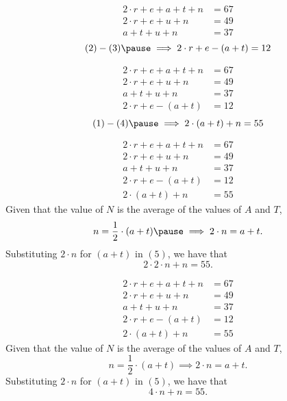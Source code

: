 \documentclass{beamer} %
\begin{document}
\begin{frame}
  \begin{align}
    2\cdot r+e+a+t+n &= 67 \\
    2\cdot r+e+u+n &= 49   \\
    a+t+u+n &= 37
  \end{align}\pause
  \[
    (2) - (3) \pause \implies 2\cdot r+e-(a+t)=12
  \]
\end{frame}

\setcounter{equation}{0} %

\begin{frame}
  \begin{align}
    2\cdot r+e+a+t+n &= 67 \\
    2\cdot r+e+u+n &= 49   \\
    a+t+u+n &= 37          \\
    2\cdot r+e-(a+t) &= 12
  \end{align}\pause
  \[
    (1) - (4) \pause \implies 2\cdot(a+t)+n=55
  \]
\end{frame}

\setcounter{equation}{0}

\begin{frame}
  \begin{align}
    2\cdot r+e+a+t+n &= 67 \\
    2\cdot r+e+u+n &= 49   \\
    a+t+u+n &= 37          \\
    2\cdot r+e-(a+t) &= 12 \\
    2\cdot(a+t)+n &= 55
  \end{align}\pause
  Given that the value of $N$ is the average of the values of $A$ and $T$,\pause
  \[
    n=\frac{1}{2}\cdot(a+t) \pause \implies 2 \cdot n = a + t.
  \]\pause
  Substituting $2\cdot n$ for $(a+t)$ in $(5)$, we have that\pause
  \[
    2\cdot 2\cdot n+n=55.
  \]
\end{frame}

\setcounter{equation}{0}

\begin{frame}
  \begin{align}
    2\cdot r+e+a+t+n &= 67 \\
    2\cdot r+e+u+n &= 49   \\
    a+t+u+n &= 37          \\
    2\cdot r+e-(a+t) &= 12 \\
    2\cdot(a+t)+n &= 55
  \end{align}
  Given that the value of $N$ is the average of the values of $A$ and $T$,
  \[
    n=\frac{1}{2}\cdot(a+t) \implies 2 \cdot n = a + t.
  \]
  Substituting $2\cdot n$ for $(a+t)$ in $(5)$, we have that
  \[
    4\cdot n+n=55.
  \]
\end{frame}
\end{document}
